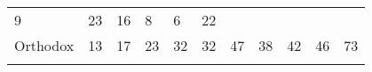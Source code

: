 \documentclass[]{article}
\begin{document}
\begin{longtable}[]{@{}lllllllllll@{}}
\begin{minipage}[t]{0.05\columnwidth}
9\strut
\end{minipage} & \begin{minipage}[t]{0.05\columnwidth}\raggedright
23\strut
\end{minipage} & \begin{minipage}[t]{0.06\columnwidth}\raggedright
16\strut
\end{minipage} & \begin{minipage}[t]{0.06\columnwidth}\raggedright
8\strut
\end{minipage} & \begin{minipage}[t]{0.04\columnwidth}\raggedright
6\strut
\end{minipage} & \begin{minipage}[t]{0.11\columnwidth}\raggedright
22\strut
\end{minipage}\tabularnewline
\begin{minipage}[t]{0.14\columnwidth}\raggedright
Orthodox\strut
\end{minipage} & \begin{minipage}[t]{0.04\columnwidth}\raggedright
13\strut
\end{minipage} & \begin{minipage}[t]{0.05\columnwidth}\raggedright
17\strut
\end{minipage} & \begin{minipage}[t]{0.05\columnwidth}\raggedright
23\strut
\end{minipage} & \begin{minipage}[t]{0.05\columnwidth}\raggedright
32\strut
\end{minipage} & \begin{minipage}[t]{0.05\columnwidth}\raggedright
32\strut
\end{minipage} & \begin{minipage}[t]{0.05\columnwidth}\raggedright
47\strut
\end{minipage} & \begin{minipage}[t]{0.06\columnwidth}\raggedright
38\strut
\end{minipage} & \begin{minipage}[t]{0.06\columnwidth}\raggedright
42\strut
\end{minipage} & \begin{minipage}[t]{0.04\columnwidth}\raggedright
46\strut
\end{minipage} & \begin{minipage}[t]{0.11\columnwidth}\raggedright
73\strut
\end{minipage}\tabularnewline
\begin{minipage}[t]{0.14\columnwidth}\raggedright

\end{minipage}
\end{longtable}
\end{document}

